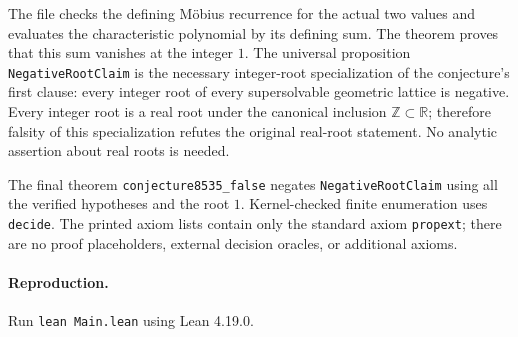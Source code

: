 \documentclass[10pt]{article}
\begin{document}
The file checks the defining M\"obius recurrence for the actual two values and evaluates the characteristic polynomial by its defining sum. The theorem  proves that this sum vanishes at the integer $1$. The universal proposition \texttt{NegativeRootClaim} is the necessary integer-root specialization of the conjecture's first clause: every integer root of every supersolvable geometric lattice is negative. Every integer root is a real root under the canonical inclusion $\mathbb Z\subset\mathbb R$; therefore falsity of this specialization refutes the original real-root statement. No analytic assertion about real roots is needed.

The final theorem \texttt{conjecture8535\_false} negates \texttt{NegativeRootClaim} using all the verified hypotheses and the root $1$. Kernel-checked finite enumeration uses \texttt{decide}. The printed axiom lists contain only the standard axiom \texttt{propext}; there are no proof placeholders, external decision oracles, or additional axioms.
\paragraph{Reproduction.}
Run \texttt{lean Main.lean} using Lean 4.19.0.
\end{document}
